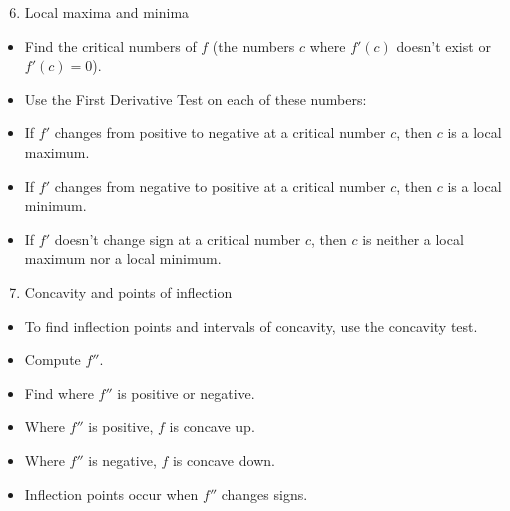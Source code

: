 \begin{frame}[t]
\begin{enumerate}
\setcounter{enumi}{5}
\item  Local maxima and minima
\end{enumerate}
\begin{itemize}
\item  Find the critical numbers of $f$ (the numbers $c$ where $f'(c)$ doesn't exist or $f'(c) = 0$).
\item  Use the First Derivative Test on each of these numbers:
\item  If $f'$ changes from positive to negative at a critical number $c$, then $c$ is a local maximum.
\item  If $f'$ changes from negative to positive at a critical number $c$, then $c$ is a local minimum.
\item  If $f'$ doesn't change sign at a critical number $c$, then $c$ is neither a local maximum nor a local minimum.
\end{itemize}
\end{frame}



\begin{frame}[t]
\begin{enumerate}
\setcounter{enumi}{6}
\item  Concavity and points of inflection
\end{enumerate}
\begin{itemize}
\item  To find inflection points and intervals of concavity, use the concavity test.
\item  Compute $f''$.
\item  Find where $f''$ is positive or negative.
\item  Where $f''$ is positive, $f$ is concave up.
\item  Where $f''$ is negative, $f$ is concave down.
\item  Inflection points occur when $f''$ changes signs.
\end{itemize}
\end{frame}
